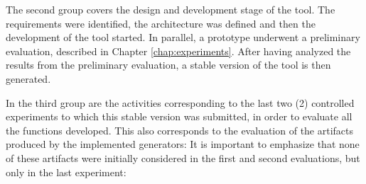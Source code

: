 The second group covers the design and development stage of the tool.
The requirements were identified, the architecture was defined and then the development of the tool started.
In parallel, a prototype underwent a preliminary evaluation, described in Chapter \ref{chap:experiments}.
After having analyzed the results from the preliminary evaluation, a stable version of the tool is then generated.


In the third group are the activities corresponding to the last two (2) controlled experiments to which this stable version was submitted, in order to evaluate all the functions developed.
This also corresponds to the evaluation of the artifacts produced by the implemented generators:
It is important to emphasize that none of these artifacts were initially considered in the first and second evaluations, but only in the last experiment:

